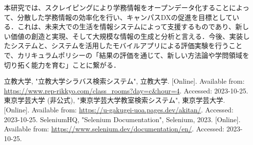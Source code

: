 \documentclass[11pt]{ujarticle}
\begin{document}
本研究では、スクレイピングにより学務情報をオープンデータ化することによって、分散した学務情報の効率化を行い、キャンパスDXの促進を目標としている．これは、未来大での生活を情報システムによって支援するものであり、新しい価値の創造と実現、そして大規模な情報の生成と分析と言える．今後、実装したシステムと、システムを活用したモバイルアプリによる評価実験を行うことで、カリキュラムポリシーの「結果の評価を通じて、新しい方法論や学問領域を切り拓く能力を育む」ことに繋がる．

\begin{thebibliography}{99}
	立教大学, "立教大学シラバス検索システム", 立教大学. [Online]. Available from: \url{https://www.rep-rikkyo.com/class_rooms?day=c&hour=4}. Accessed: 2023-10-25.
	東京学芸大学 (非公式), "東京学芸大学教室検索システム", 東京学芸大学. [Online]. Available from: \url{https://u-gakugei-uoa.pages.dev/akitan/}. Accessed: 2023-10-25.
	SeleniumHQ, "Selenium Documentation", Selenium, 2023. [Online]. Available from: \url{https://www.selenium.dev/documentation/en/}. Accessed: 2023-10-25.
\end{thebibliography}
\end{document}
